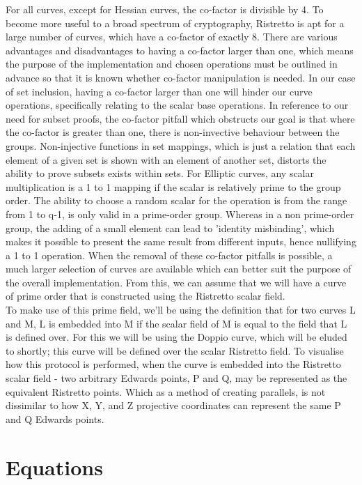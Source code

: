 \documentclass[letterpaper, 10 pt, conference]{ieeeconf}  %
\begin{document}
For all curves, except for Hessian curves, the co-factor is divisible by 4. To become more useful to a broad spectrum of cryptography, Ristretto is apt for a large number of curves, which have a co-factor of exactly 8. There are various advantages and disadvantages to having a co-factor larger than one, which means the purpose of the implementation and chosen operations must be outlined in advance so that it is known whether co-factor manipulation is needed. In our case of set inclusion, having a co-factor larger than one will hinder our curve operations, specifically relating to the scalar base operations. In reference to our need for subset proofs, the co-factor pitfall which obstructs our goal is that where the co-factor is greater than one, there is non-invective behaviour between the groups. Non-injective functions in set mappings, which is just a relation that each element of a given set is shown with an element of another set, distorts the ability to prove subsets exists within sets. For Elliptic curves, any scalar multiplication is a 1 to 1 mapping if the scalar is relatively prime to the group order. The ability to choose a random scalar for the operation is from the range from 1 to q-1, is only valid in a prime-order group. Whereas in a non prime-order group, the adding of a small element can lead to 'identity misbinding', which makes it possible to present the same result from different inputs, hence nullifying a 1 to 1 operation. When the removal of these co-factor pitfalls is possible, a much larger selection of curves are available which can better suit the purpose of the overall implementation. From this, we can assume that we will have a curve of prime order that is constructed using the Ristretto scalar field.  \\

To make use of this prime field, we’ll be using the definition that for two curves L and M, L is embedded into M if the scalar field of M is equal to the field that L is defined over. For this we will be using the Doppio curve, which will be eluded to shortly; this curve will be defined over the scalar Ristretto field. To visualise how this protocol is performed, when the curve is embedded into the Ristretto scalar field - two arbitrary Edwards points, P and Q, may be represented as the equivalent Ristretto points. Which as a method of creating parallels, is not dissimilar to how X, Y, and Z projective coordinates can represent the same P and Q Edwards points. \\


\section{Equations}
\end{document}
